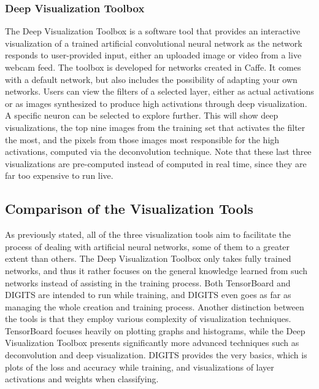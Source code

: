 \subsubsection{Deep Visualization Toolbox}

The Deep Visualization Toolbox \cite{yosinski-deepvis} is a software tool that provides an interactive visualization of a trained artificial convolutional neural network as the network responds to user-provided input, either an uploaded image or video from a live webcam feed. The toolbox is developed for networks created in Caffe. It comes with a default network, but also includes the possibility of adapting your own networks. Users can view the filters of a selected layer, either as actual activations or as images synthesized to produce high activations through deep visualization. A specific neuron can be selected to explore further. This will show deep visualizations, the top nine images from the training set that activates the filter the most, and the pixels from those images most responsible for the high activations, computed via the deconvolution technique. Note that these last three visualizations are pre-computed instead of computed in real time, since they are far too expensive to run live.


\subsection{Comparison of the Visualization Tools}


As previously stated, all of the three visualization tools aim to facilitate the process of dealing with artificial neural networks, some of them to a greater extent than others. The Deep Visualization Toolbox only takes fully trained networks, and thus it rather focuses on the general knowledge learned from such networks instead of assisting in the training process. Both TensorBoard and DIGITS are intended to run while training, and DIGITS even goes as far as managing the whole creation and training process. Another distinction between the tools is that they employ various complexity of visualization techniques. TensorBoard focuses heavily on plotting graphs and histograms, while the Deep Visualization Toolbox presents significantly more advanced techniques such as deconvolution and deep visualization. DIGITS provides the very basics, which is plots of the loss and accuracy while training, and visualizations of layer activations and weights when classifying.

